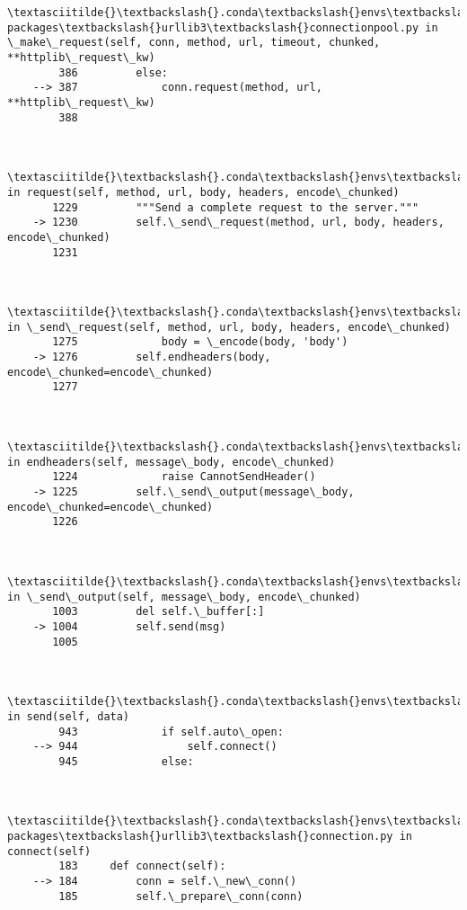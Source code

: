 \begin{Verbatim}[commandchars=\\\{\}]
        \textasciitilde{}\textbackslash{}.conda\textbackslash{}envs\textbackslash{}SACCRconda\textbackslash{}lib\textbackslash{}site-packages\textbackslash{}urllib3\textbackslash{}connectionpool.py in \_make\_request(self, conn, method, url, timeout, chunked, **httplib\_request\_kw)
        386         else:
    --> 387             conn.request(method, url, **httplib\_request\_kw)
        388 
    

        \textasciitilde{}\textbackslash{}.conda\textbackslash{}envs\textbackslash{}SACCRconda\textbackslash{}lib\textbackslash{}http\textbackslash{}client.py in request(self, method, url, body, headers, encode\_chunked)
       1229         """Send a complete request to the server."""
    -> 1230         self.\_send\_request(method, url, body, headers, encode\_chunked)
       1231 
    

        \textasciitilde{}\textbackslash{}.conda\textbackslash{}envs\textbackslash{}SACCRconda\textbackslash{}lib\textbackslash{}http\textbackslash{}client.py in \_send\_request(self, method, url, body, headers, encode\_chunked)
       1275             body = \_encode(body, 'body')
    -> 1276         self.endheaders(body, encode\_chunked=encode\_chunked)
       1277 
    

        \textasciitilde{}\textbackslash{}.conda\textbackslash{}envs\textbackslash{}SACCRconda\textbackslash{}lib\textbackslash{}http\textbackslash{}client.py in endheaders(self, message\_body, encode\_chunked)
       1224             raise CannotSendHeader()
    -> 1225         self.\_send\_output(message\_body, encode\_chunked=encode\_chunked)
       1226 
    

        \textasciitilde{}\textbackslash{}.conda\textbackslash{}envs\textbackslash{}SACCRconda\textbackslash{}lib\textbackslash{}http\textbackslash{}client.py in \_send\_output(self, message\_body, encode\_chunked)
       1003         del self.\_buffer[:]
    -> 1004         self.send(msg)
       1005 
    

        \textasciitilde{}\textbackslash{}.conda\textbackslash{}envs\textbackslash{}SACCRconda\textbackslash{}lib\textbackslash{}http\textbackslash{}client.py in send(self, data)
        943             if self.auto\_open:
    --> 944                 self.connect()
        945             else:
    

        \textasciitilde{}\textbackslash{}.conda\textbackslash{}envs\textbackslash{}SACCRconda\textbackslash{}lib\textbackslash{}site-packages\textbackslash{}urllib3\textbackslash{}connection.py in connect(self)
        183     def connect(self):
    --> 184         conn = self.\_new\_conn()
        185         self.\_prepare\_conn(conn)
    


\end{Verbatim}
